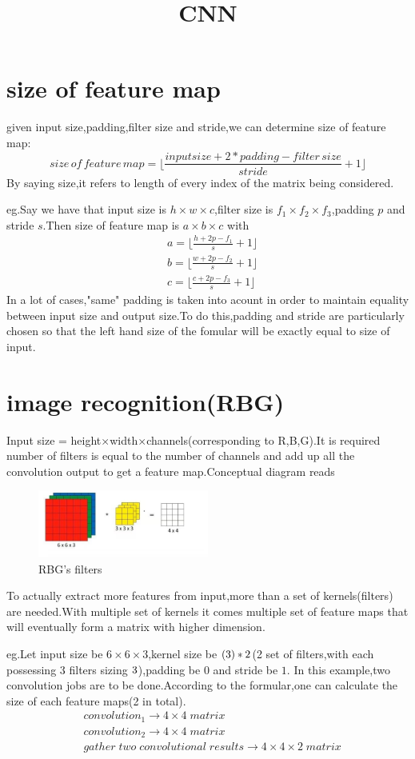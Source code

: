 \documentclass{article}
\begin{document}
\title{CNN}
\date{ }
\maketitle
\section{size of feature map}
given input size,padding,filter size and stride,we can determine size of feature map:$$size\,of\,feature\,map=\lfloor\frac{inputsize+2*padding-filter\,size}{stride}+1\rfloor $$By saying size,it refers to length of every index of the matrix being considered.
\par eg.Say we have that input size is $h\times w\times c$,filter size is $f_1\times f_2\times f_3$,padding $p$ and stride $s$.Then size of feature map is $a\times b\times c$ with
\begin{align*}
	&a=\lfloor\frac{h+2p-f_1}{s}+1\rfloor\\
	&b=\lfloor\frac{w+2p-f_2}{s}+1\rfloor\\
	&c=\lfloor\frac{c+2p-f_3}{s}+1\rfloor
\end{align*}
In a lot of cases,"same" padding is taken into acount in order to maintain equality between input size and output size.To do this,padding and stride are particularly chosen so that the left hand size of the fomular will be exactly equal to size of input.
\section{image recognition(RBG)}
Input size = height$\times$width$\times$channels(corresponding to R,B,G).It is required number of filters is equal to the number of channels and add up all the convolution output to get a feature map.Conceptual diagram reads
\begin{figure}[htbp]
	\centering
	\includegraphics[width=0.5\textwidth]{1.jpg}
	\caption{RBG's filters}
\end{figure}
To actually extract more features from input,more than a set of kernels(filters) are needed.With multiple set of kernels it comes multiple set of feature maps that will eventually form a matrix with higher dimension.
\par eg.Let input size be $6\times6\times3$,kernel size be $(3\time3\time3)*2$(2 set of filters,with each possessing 3 filters sizing $3\time3$),padding be $0$ and stride be $1$.
In this example,two convolution jobs are to be done.According to the formular,one can calculate the size of each feature maps(2 in total).
\begin{align*}
	&convolution_1\rightarrow4\times4\;matrix\\
	&convolution_2\rightarrow4\times4\;matrix\\
	&gather\;two\;convolutional\;results\rightarrow4\times4\times2\;matrix
\end{align*}
\end{document}
